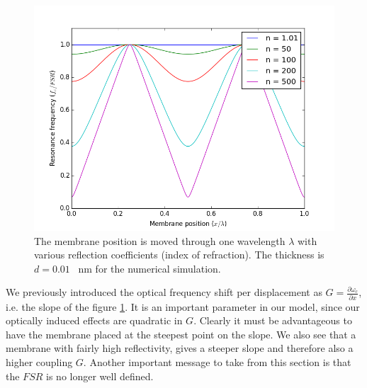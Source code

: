 \begin{figure}[H]
\centering
\includegraphics[scale=0.8]{transfer_matrix_python.png}
\caption{The membrane position is moved through one wavelength $\lambda$ with various reflection coefficients (index of refraction). The thickness is $d = 0.01$ \SI{}{\nano\meter} for the numerical simulation.}
\label{fig:transfer_model_plot}
\end{figure}

We previously introduced the optical frequency shift per displacement as $G = \frac{\partial\omega_c}{\partial x}$, i.e. the slope of the figure \ref{fig:transfer_model_plot}. It is an important parameter in our model, since our optically induced effects are quadratic in $G$. Clearly it must be advantageous to have the membrane placed at the steepest point on the slope. We also see that a membrane with fairly high reflectivity, gives a steeper slope and therefore also a higher coupling $G$. Another important message to take from this section is that the $FSR$ is no longer well defined.